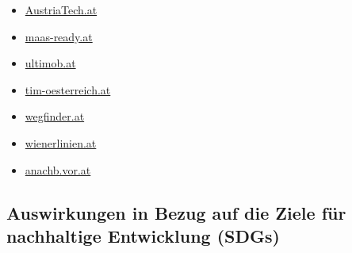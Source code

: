 \documentclass[
]{book}
\providecommand{\tightlist}{%
  \setlength{\itemsep}{0pt}\setlength{\parskip}{0pt}}
\begin{document}
\begin{itemize}
\tightlist
\item
  \href{https://www.austriatech.at/assets/Uploads/Publikationen/PDF-Dateien/29fc02ada2/MaaS-miA_english_102019_web.pdf}{AustriaTech.at}
\item
  \href{https://maas-ready.at}{maas-ready.at}
\item
  \href{https://www.ultimob.at}{ultimob.at}
\item
  \href{https://www.tim-oesterreich.at/graz/}{tim-oesterreich.at}
\item
  \href{https://wegfinder.at/}{wegfinder.at}
\item
  \href{https://www.wienerlinien.at/eportal3/ep/channelView.do/pageTypeId/66526/channelId/-3600060}{wienerlinien.at}
\item
  \href{https://anachb.vor.at/}{anachb.vor.at}
\end{itemize}

\hypertarget{auswirkungen-in-bezug-auf-die-ziele-fuxfcr-nachhaltige-entwicklung-sdgs-24}{%
\subsection*{Auswirkungen in Bezug auf die Ziele für nachhaltige Entwicklung (SDGs)}\label{auswirkungen-in-bezug-auf-die-ziele-fuxfcr-nachhaltige-entwicklung-sdgs-24}}
\end{document}
